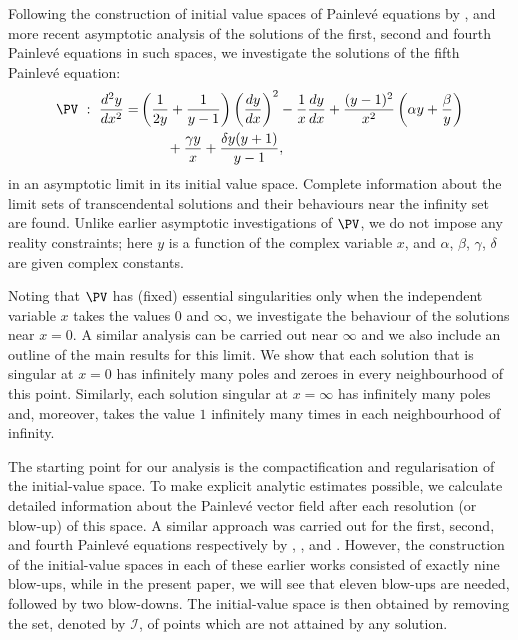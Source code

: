 Following the construction of initial value spaces of Painlev\'e equations by \citeauthor{Okamoto1979} , and more recent asymptotic analysis of the solutions of the first, second and fourth Painlev\'e equations in such spaces, we investigate the solutions of the fifth Painlev\'e equation:
\begin{equation}\label{eq:PV}
\begin{split}
\PV\ : \ \frac{d^2y}{dx^2}=&\left(\frac{1}{2y}+\frac{1}{y-1}\right) \left(\frac{dy}{dx}\right)^2-\frac{1}{x}\frac{dy}{dx}+\frac{(y-1)^2}{x^2}\left(\alpha y+\frac{\beta}{y}\right)\\
&\qquad+\frac{\gamma y}{x}+\frac{\delta y(y+1)}{y-1},
\end{split}
\end{equation}
in an asymptotic limit in its initial value space. Complete information about the limit sets of transcendental solutions and their behaviours near the infinity set are found. Unlike earlier asymptotic investigations of $\PV$, we do not impose any reality constraints; here $y$ is a function of the complex variable $x$, and $\alpha$, $\beta$, $\gamma$, $\delta$ are given complex constants.

Noting that $\PV$ has (fixed) essential singularities only when the independent variable $x$ takes the values $0$ and $\infty$, we investigate the behaviour of the solutions near $x=0$. A similar analysis can be carried out near $\infty$ and we also include an outline of the main results for this limit.  We show that each solution that is singular at $x=0$ has infinitely many poles and zeroes in every neighbourhood of this point. Similarly, each solution singular at $x=\infty$ has infinitely many poles and, moreover, takes the value $1$ infinitely many times in each neighbourhood of infinity.

The starting point for our analysis is the compactification and regularisation of the initial-value space. To make explicit analytic estimates possible, we calculate detailed information about the Painlev\'e vector field after each resolution (or blow-up) of this space. A similar approach was carried out for the first, second, and fourth Painlev\'e equations respectively by , , and . However, the construction of the initial-value spaces in each of these earlier works consisted of exactly nine blow-ups, while in the present paper, we will see that eleven blow-ups are needed, followed by two blow-downs.
The initial-value space is then obtained by removing the set, denoted by $\mathcal{I}$, of points which are not attained by any solution.

